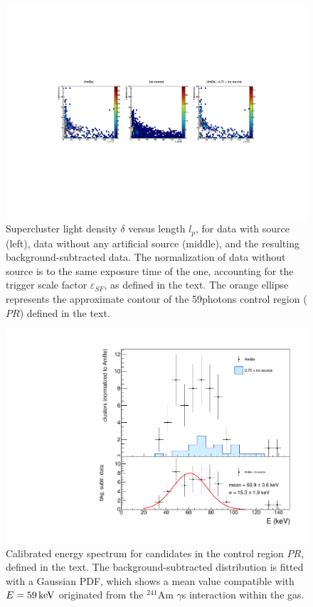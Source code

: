 \begin{figure}[ht]
  \begin{center}
  \includegraphics[width=0.90\linewidth]{figures/densityvslength_zoom}

  \caption{Supercluster light density $\delta$ versus length $l_p$,
    for data with \ambe source (left), data without any artificial
    source (middle), and the resulting background-subtracted \ambe
    data.  The normalization of data without source is to the same
    exposure time of the \ambe one, accounting for the trigger scale
    factor $\varepsilon_{SF}$, as defined in the text. The orange
    ellipse represents the approximate contour of the 59\keV photons
    control region ($PR$) defined in the text. \label{fig:dvsl}}

  \end{center}
\end{figure}

\begin{figure}[ht]
  \begin{center}
  \includegraphics[width=0.60\linewidth]{figures/calintegral_59keV}

  \caption{Calibrated energy spectrum for candidates in the control
    region $PR$, defined in the text. The background-subtracted
    distribution is fitted with a Gaussian PDF, which shows a mean
    value compatible with $E=59\,\textrm{ke\hspace{-.08em}V}$ originated from the $^{241}$Am
    $\gamma$s interaction within the gas. \label{fig:59keV}}

  \end{center}
\end{figure}

